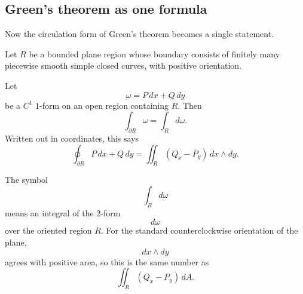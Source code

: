 \subsection{Green's theorem as one formula}

Now the circulation form of Green's theorem becomes a single statement.

\begin{theorem}
Let \(R\) be a bounded plane region whose boundary consists of finitely many
piecewise smooth simple closed curves, with positive orientation.

Let
\[
    \omega=P\,dx+Q\,dy
\]
be a \(C^1\) \(1\)-form on an open region containing \(R\).  Then
\[
\boxed{
    \int_{\partial R}\omega
    =
    \int_R d\omega.
}
\]
Written out in coordinates, this says
\[
\boxed{
    \oint_{\partial R} P\,dx+Q\,dy
    =
    \iint_R (Q_x-P_y)\,dx\wedge dy.
}
\]
\end{theorem}

The symbol
\[
    \int_R d\omega
\]
means an integral of the \(2\)-form
\[
    d\omega
\]
over the oriented region \(R\).  For the standard counterclockwise orientation of the
plane,
\[
    dx\wedge dy
\]
agrees with positive area, so this is the same number as
\[
    \iint_R (Q_x-P_y)\,dA.
\]


